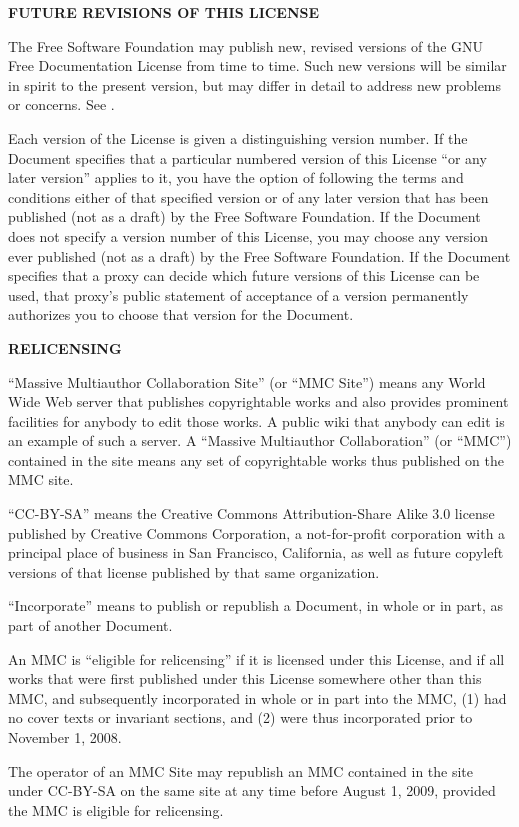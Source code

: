 \item
{\bf FUTURE REVISIONS OF THIS LICENSE}

The Free Software Foundation may publish new, revised versions of the GNU Free Documentation License from time to time.  Such new versions will be similar in spirit to the present version, but may differ in detail to address new problems or concerns.  See .

Each version of the License is given a distinguishing version number. If the Document specifies that a particular numbered version of this License ``or any later version'' applies to it, you have the option of following the terms and conditions either of that specified version or of any later version that has been published (not as a draft) by the Free Software Foundation.  If the Document does not specify a version number of this License, you may choose any version ever published (not as a draft) by the Free Software Foundation.  If the Document specifies that a proxy can decide which future versions of this License can be used, that proxy's public statement of acceptance of a version permanently authorizes you to choose that version for the Document.

\item
{\bf RELICENSING}

``Massive Multiauthor Collaboration Site'' (or ``MMC Site'') means any World Wide Web server that publishes copyrightable works and also provides prominent facilities for anybody to edit those works.  A public wiki that anybody can edit is an example of such a server.  A ``Massive Multiauthor Collaboration'' (or ``MMC'') contained in the site means any set of copyrightable works thus published on the MMC site.

``CC-BY-SA'' means the Creative Commons Attribution-Share Alike 3.0 license published by Creative Commons Corporation, a not-for-profit corporation with a principal place of business in San Francisco, California, as well as future copyleft versions of that license published by that same organization.

``Incorporate'' means to publish or republish a Document, in whole or in part, as part of another Document.

An MMC is ``eligible for relicensing'' if it is licensed under this License, and if all works that were first published under this License somewhere other than this MMC, and subsequently incorporated in whole or in part into the MMC, (1) had no cover texts or invariant sections, and (2) were thus incorporated prior to November 1, 2008.

The operator of an MMC Site may republish an MMC contained in the site under CC-BY-SA on the same site at any time before August 1, 2009, provided the MMC is eligible for relicensing.

\stopitemize

